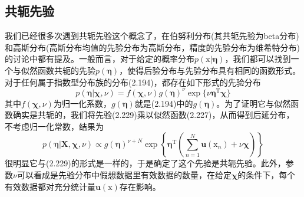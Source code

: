\documentclass[b5paper]{book}
\numberwithin{equation}{chapter}
\newcommand {\bx} {\boldsymbol{\mathrm{x}}}
\newcommand {\rmT} {\mathrm{T}}
\newcommand {\bfeta} {\boldsymbol{\eta}}
\begin{document}
	\subsection{共轭先验}
	\textnormal{
	我们已经很多次遇到共轭先验这个概念了，在伯努利分布(其共轭先验为beta分布)和高斯分布(高斯分布均值的先验分布为高斯分布，精度的先验分布为维希特分布)的讨论中都有提及。一般而言，对于给定的概率分布$p(\bx|\bfeta)$，我们都可以找到一个与似然函数共轭的先验$p(\bfeta)$，使得后验分布与先验分布具有相同的函数形式。对于任何属于指数型分布族的分布(2.194)，都存在如下形式的先验分布
	\begin{equation}
		p(\bfeta|\boldsymbol{\chi},\nu)=f(\boldsymbol{\chi},\nu)g(\bfeta)^{\nu}\exp\{\nu \bfeta^{\rmT}\boldsymbol{\chi}\}
	\end{equation}
	其中$f(\boldsymbol{\chi},\nu)$为归一化系数，$g(\bfeta)$就是(2.194)中的$g(\bfeta)$。为了证明它与似然函数确实是共轭的，我们将先验(2.229)乘以似然函数(2.227)，从而得到后延分布，不考虑归一化常数，结果为
	\begin{equation}
		p(\bfeta|\mathbf{X},\boldsymbol{\chi},\nu) \propto g(\bfeta)^{\nu+N}\exp\left\{\bfeta^{\rmT}\left(\sum_{n=1}^N\mathbf{u}(\bx_n)+\nu \boldsymbol{\chi}\right)\right\}
	\end{equation}
	很明显它与(2.229)的形式是一样的，于是确定了这个先验是共轭先验。此外，参数$\nu$可以看成是先验分布中假想数据里有效数据的数量，在给定$\boldsymbol{\chi}$的条件下，每个有效数据都对充分统计量$\mathbf{u}(\bx)$存在影响。
	}
\end{document}
